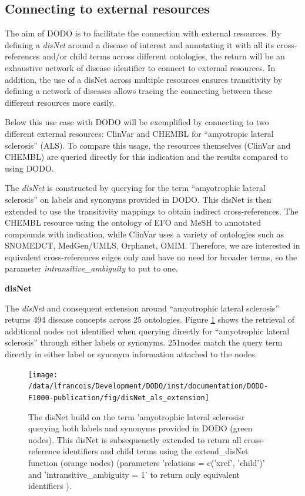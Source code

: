 \documentclass[9pt,a4paper,]{extarticle}
\begin{document}
\hypertarget{connecting-to-external-resources}{%
\subsection{Connecting to external resources}\label{connecting-to-external-resources}}

The aim of DODO is to facilitate the connection with external resources. By defining a \emph{disNet} around a disease of interest and annotating it with all its cross-references and/or child terms across different ontologies, the return will be an exhaustive network of disease identifier to connect to external resources. In addition, the use of a disNet across multiple resources ensures transitivity by defining a network of diseases allows tracing the connecting between these different resources more easily.

Below this use case with DODO will be exemplified by connecting to two different external resources: ClinVar and CHEMBL for ``amyotropic lateral sclerosis'' (ALS). To compare this usage, the resources themselves (ClinVar and CHEMBL) are queried directly for this indication and the results compared to using DODO.

The \emph{disNet} is constructed by querying for the term ``amyotrophic lateral sclerosis'' on labels and synonyms provided in DODO. This disNet is then extended to use the transitivity mappings to obtain indirect cross-references. The CHEMBL resource using the ontology of EFO and MeSH to annotated compounds with indication, while ClinVar uses a variety of ontologies such as SNOMEDCT, MedGen/UMLS, Orphanet, OMIM. Therefore, we are interested in equivalent cross-references edges only and have no need for broader terms, so the parameter \emph{intransitive\_ambiguity} to put to one.

\textbf{disNet}

The \emph{disNet} and consequent extension around ``amyotrophic lateral sclerosis'' returns 494 disease concepts across 25 ontologies. Figure \ref{fig:disNetalsExtension} shows the retrieval of additional nodes not identified when querying directly for ``amyotrophic lateral sclerosis'' through either labels or synonyms. 251nodes match the query term directly in either label or synonym information attached to the nodes.

\begin{figure}

{\centering \texttt{[image: /data/lfrancois/Development/DODO/inst/documentation/DODO-F1000-publication/fig/disNet\_als\_extension]} 

}

\caption{The disNet build on the term 'amyotrophic lateral sclerosisr querying both labels and synonyms provided in DODO (green nodes). This disNet is subsequenctly extended to return all cross-reference identifiers and child terms using the extend\_disNet function (orange nodes) (parameters 'relations = c('xref', 'child')' and 'intransitive\_ambiguity = 1' to return only equivalent identifiers ).}\label{fig:disNetalsExtension}
\end{figure}
\end{document}
